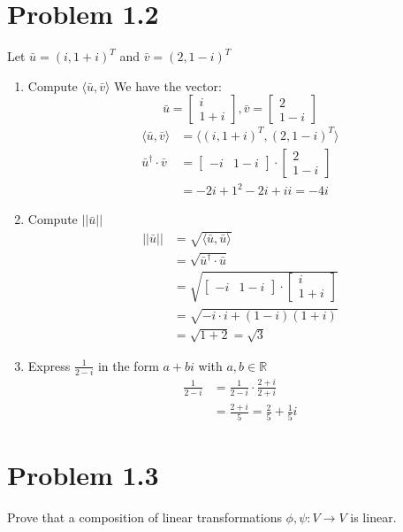 \documentclass[12pt]{article}
\begin{document}
\section*{Problem 1.2}
Let \(\bar{u} = (i, 1+i)^T\) and \(\bar{v} = (2, 1-i)^T\)
\begin{enumerate}
    \item Compute \(\langle \bar{u}, \bar{v} \rangle\)
    We have the vector:
    \[\bar{u} = \begin{bmatrix}
        i \\
        1+i
    \end{bmatrix},
    \bar{v} = \begin{bmatrix}
        2 \\
        1-i
    \end{bmatrix}
    \]
    \begin{align*}
        \langle \bar{u}, \bar{v} \rangle &= \langle (i, 1+i)^T, (2, 1-i)^T \rangle \\
        \bar{u}^\dagger \cdot \bar{v} &= 
        \begin{bmatrix}
            -i & 1-i    
        \end{bmatrix}
        \cdot 
        \begin{bmatrix}
            2 \\
            1-i
        \end{bmatrix}\\
        &= -2i + 1^2 -2i + ii = -4i 
    \end{align*}
    \item Compute \(||\bar{u}||\)
    \begin{align*}
        ||\bar{u}|| &= \sqrt{\langle \bar{u}, \bar{u} \rangle} \\
        &= \sqrt{\bar{u}^\dagger \cdot \bar{u}} \\
        &= \sqrt{\begin{bmatrix}
            -i & 1-i
        \end{bmatrix}
        \cdot
        \begin{bmatrix}
            i \\
            1+i
        \end{bmatrix}} \\
        &= \sqrt{-i \cdot i + (1-i)(1+i)} \\
        &= \sqrt{1 + 2} = \sqrt{3}
    \end{align*}
    \item Express \(\frac{1}{2-i}\) in the form \(a+bi\) with \(a, b \in \mathbb{R}\)
    \begin{align*}
        \frac{1}{2-i} &= \frac{1}{2-i} \cdot \frac{2+i}{2+i} \\
        &= \frac{2+i}{5} = \frac{2}{5} + \frac{1}{5}i
    \end{align*}
\end{enumerate}
\section*{Problem 1.3}
Prove that a composition of linear transformations \(\phi, \psi: V \rightarrow V\) is linear.
\end{document}
